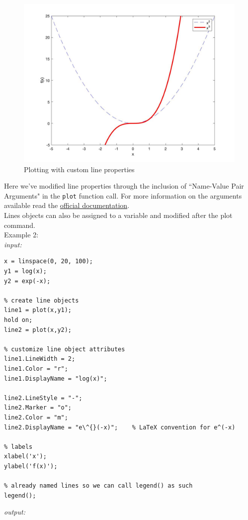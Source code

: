 \documentclass[../MATLAB_Primer.tex]{subfiles}
\begin{document}
\begin{figure}[H]
    \centering
    \includegraphics[width=350pt]{images/plotting_example3.jpg}
    \caption{Plotting with custom line properties}
    \label{fig:plotting_example3}
\end{figure}

Here we've modified line properties through the inclusion of ``Name-Value Pair Arguments" in the \texttt{plot} function call. For more information on the arguments available read the \href{https://www.mathworks.com/help/matlab/ref/plot.html#namevaluepairs}{\color{blue}official documentation}.\\

Lines objects can also be assigned to a variable and modified after the plot command.\\

Example 2:\\

\textit{input:}
\begin{lstlisting}
x = linspace(0, 20, 100);
y1 = log(x);
y2 = exp(-x);

% create line objects 
line1 = plot(x,y1);
hold on;
line2 = plot(x,y2);

% customize line object attributes
line1.LineWidth = 2;
line1.Color = "r";
line1.DisplayName = "log(x)";

line2.LineStyle = "-";
line2.Marker = "o";
line2.Color = "m";
line2.DisplayName = "e\^{}(-x)";    % LaTeX convention for e^(-x)

% labels
xlabel('x');
ylabel('f(x)');

% already named lines so we can call legend() as such
legend();

\end{lstlisting}
\textit{output:}
\end{document}
